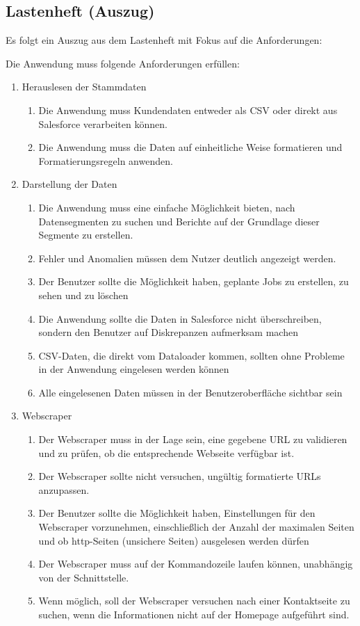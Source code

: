 \subsection{Lastenheft (Auszug)}
\label{app:Lastenheft}
Es folgt ein Auszug aus dem Lastenheft mit Fokus auf die Anforderungen:

Die Anwendung muss folgende Anforderungen erfüllen: 
\begin{enumerate}[itemsep=0em,partopsep=0em,parsep=0em,topsep=0em]
\item Herauslesen der Stammdaten
	\begin{enumerate}
	\item Die Anwendung muss Kundendaten entweder als CSV oder direkt aus Salesforce verarbeiten können.
	\item Die Anwendung muss die Daten auf einheitliche Weise formatieren und Formatierungsregeln anwenden.
	\end{enumerate}
\item Darstellung der Daten
	\begin{enumerate}
	\item Die Anwendung muss eine einfache Möglichkeit bieten, nach Datensegmenten zu suchen und Berichte auf der Grundlage dieser Segmente zu erstellen.
	\item Fehler und Anomalien müssen dem Nutzer deutlich angezeigt werden.
	\item Der Benutzer sollte die Möglichkeit haben, geplante Jobs zu erstellen, zu sehen und zu löschen
	\item Die Anwendung sollte die Daten in Salesforce nicht überschreiben, sondern den Benutzer auf Diskrepanzen aufmerksam machen
	\item CSV-Daten, die direkt vom Dataloader kommen, sollten ohne Probleme in der Anwendung eingelesen werden können 
 	\item Alle eingelesenen Daten müssen in der Benutzeroberfläche sichtbar sein
	\end{enumerate}
\item Webscraper
	\begin{enumerate}
	\item Der Webscraper muss in der Lage sein, eine gegebene URL zu validieren und zu prüfen, ob die entsprechende Webseite verfügbar ist.
	\item Der Webscraper sollte nicht versuchen, ungültig formatierte URLs anzupassen.
	\item Der Benutzer sollte die Möglichkeit haben, Einstellungen für den Webscraper vorzunehmen, einschließlich der Anzahl der maximalen Seiten und ob http-Seiten (unsichere Seiten) ausgelesen werden dürfen
	\item Der Webscraper muss auf der Kommandozeile laufen können, unabhängig von der Schnittstelle.
    \item Wenn möglich, soll der Webscraper versuchen nach einer Kontaktseite zu suchen, wenn die Informationen nicht auf der Homepage aufgeführt sind.
\end{enumerate}
	

\end{enumerate}
